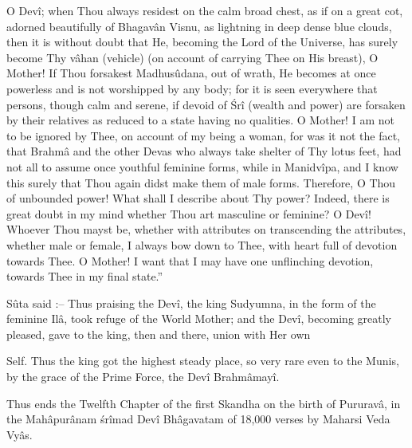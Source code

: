 O Dev\^i; when Thou always residest on the calm broad chest, as if on a great cot, adorned beautifully of Bhagav\^an Visnu, as lightning in deep dense blue clouds, then it is without doubt that He, becoming the Lord of the Universe, has surely become Thy v\^ahan (vehicle) (on account of carrying Thee on His breast), O Mother! If Thou forsakest Madhus\^udana, out of wrath, He becomes at once powerless and is not worshipped by any body; for it is seen everywhere that persons, though calm and serene, if devoid of \'Sr\^i (wealth and power) are forsaken by their relatives as reduced to a state having no qualities. O Mother! I am not to be ignored by Thee, on account of my being a woman, for was it not the fact, that Brahm\^a and the other Devas who always take shelter of Thy lotus feet, had not all to assume once youthful feminine forms, while in Manidv\^ipa, and I know this surely that Thou again didst make them of male forms. Therefore, O Thou of unbounded power! What shall I describe about Thy power? Indeed, there is great doubt in my mind whether Thou art masculine or feminine? O Dev\^i! Whoever Thou mayst be, whether with attributes on transcending the attributes, whether male or female, I always bow down to Thee, with heart full of devotion towards Thee. O Mother! I want that I may have one unflinching devotion, towards Thee in my final state.''

S\^uta said :-- Thus praising the Dev\^i, the king Sudyumna, in the form of the feminine Il\^a, took refuge of the World Mother; and the Dev\^i, becoming greatly pleased, gave to the king, then and there, union with Her own

Self. Thus the king got the highest steady place, so very rare even to the Munis, by the grace of the Prime Force, the Dev\^i Brahm\^amay\^i.

Thus ends the Twelfth Chapter of the first Skandha on the birth of Pururav\^a, in the Mah\^apur\^anam \'sr\^imad Dev\^i Bh\^agavatam of 18,000 verses by Maharsi Veda Vy\^as.